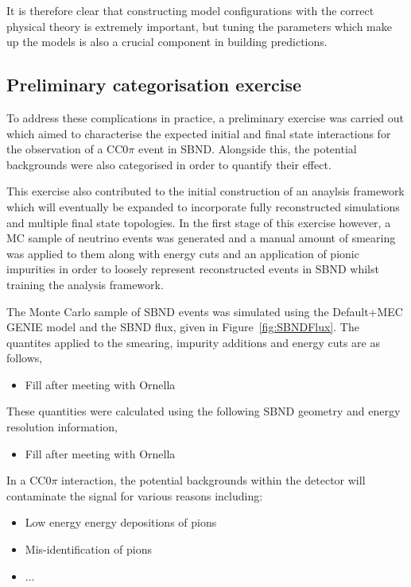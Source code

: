 It is therefore clear that constructing model configurations with the correct physical theory is extremely important, but tuning the parameters which make up the models is also a crucial component in building predictions.

\subsection{Preliminary categorisation exercise}

To address these complications in practice, a preliminary exercise was carried out which aimed to characterise the expected initial and final state interactions for the observation of a CC0\(\pi\) event in SBND. Alongside this, the potential backgrounds were also categorised in order to quantify their effect. 

    This exercise also contributed to the initial construction of an anaylsis framework which will eventually be expanded to incorporate fully reconstructed simulations and multiple final state topologies. In the first stage of this exercise however, a MC sample of neutrino events was generated and a manual amount of smearing was applied to them along with energy cuts and an application of pionic impurities in order to loosely represent reconstructed events in SBND whilst training the analysis framework.  

The Monte Carlo sample of SBND events was simulated using the Default+MEC GENIE model and the SBND flux, given in Figure~\ref{fig:SBNDFlux}. The quantites applied to the smearing, impurity additions and energy cuts are as follows, 

\begin{itemize}
    \item Fill after meeting with Ornella
\end{itemize}

These quantities were calculated using the following SBND geometry and energy resolution information,

\begin{itemize}
    \item Fill after meeting with Ornella
\end{itemize}

In a CC0\(\pi\) interaction, the potential backgrounds within the detector will contaminate the signal for various reasons including:

\begin{itemize}
    \item Low energy energy depositions of pions
    \item Mis-identification of pions
    \item ...
\end{itemize}

